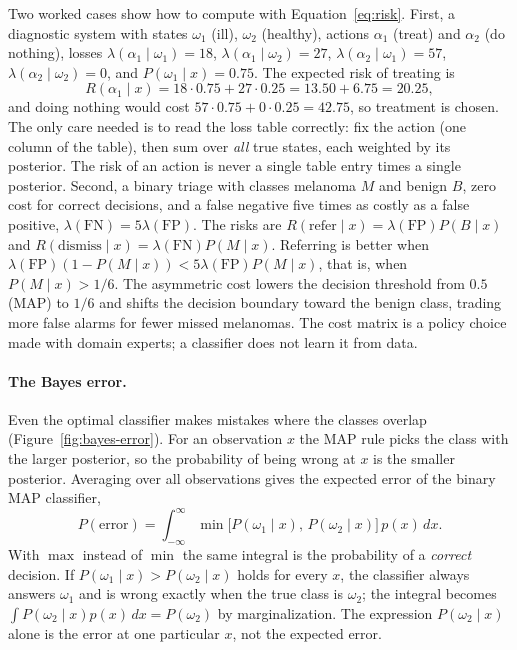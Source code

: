 Two worked cases show how to compute with Equation~\eqref{eq:risk}. First, a
diagnostic system with states $\omega_1$ (ill), $\omega_2$ (healthy), actions
$\alpha_1$ (treat) and $\alpha_2$ (do nothing), losses
$\lambda(\alpha_1\mid\omega_1) = 18$, $\lambda(\alpha_1\mid\omega_2) = 27$,
$\lambda(\alpha_2\mid\omega_1) = 57$, $\lambda(\alpha_2\mid\omega_2) = 0$, and
$P(\omega_1\mid x) = 0.75$. The expected risk of treating is
\begin{equation}
  R(\alpha_1\mid x) = 18\cdot 0.75 + 27\cdot 0.25 = 13.50 + 6.75 = 20.25,
\end{equation}
\noindent
and doing nothing would cost $57\cdot 0.75 + 0\cdot 0.25 = 42.75$, so treatment
is chosen. The only care needed is to read the loss table correctly: fix the
action (one column of the table), then sum over \emph{all} true states, each
weighted by its posterior. The risk of an action is never a single table entry
times a single posterior. Second, a
binary triage with classes melanoma $M$ and benign $B$, zero cost for correct
decisions, and a false negative five times as costly as a false positive,
$\lambda(\mathrm{FN}) = 5\lambda(\mathrm{FP})$. The risks are
$R(\text{refer}\mid x) = \lambda(\mathrm{FP})P(B\mid x)$ and
$R(\text{dismiss}\mid x) = \lambda(\mathrm{FN})P(M\mid x)$. Referring is better
when $\lambda(\mathrm{FP})(1-P(M\mid x)) < 5\lambda(\mathrm{FP})P(M\mid x)$,
that is, when $P(M\mid x) > 1/6$. The asymmetric cost lowers the decision
threshold from $0.5$ (MAP) to $1/6$ and shifts the decision boundary toward the
benign class, trading more false alarms for fewer missed melanomas. The cost
matrix is a policy choice made with domain experts; a classifier does not learn
it from data.

\paragraph{The Bayes error.}
Even the optimal classifier makes mistakes where the classes overlap
(Figure~\ref{fig:bayes-error}). For an observation $x$ the MAP rule picks the
class with the larger posterior, so the probability of being wrong at $x$ is
the smaller posterior. Averaging over all observations gives the expected error
of the binary MAP classifier,
\begin{equation}
  P(\text{error}) = \int_{-\infty}^{\infty}
  \min\bigl[P(\omega_1\mid x),\,P(\omega_2\mid x)\bigr]\,p(x)\,dx .
  \label{eq:bayes-error}
\end{equation}
\noindent
With $\max$ instead of $\min$ the same integral is the probability of a
\emph{correct} decision. If $P(\omega_1\mid x) > P(\omega_2\mid x)$ holds for
every $x$, the classifier always answers $\omega_1$ and is wrong exactly when the
true class is $\omega_2$; the integral becomes
$\int P(\omega_2\mid x)p(x)\,dx = P(\omega_2)$ by marginalization. The
expression $P(\omega_2\mid x)$ alone is the error at one particular $x$, not the
expected error.

